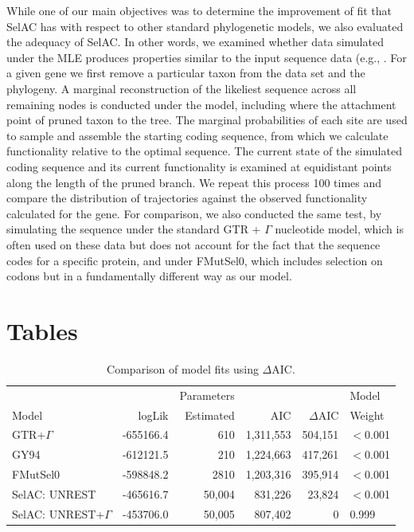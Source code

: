 \documentclass{article}
\newcommand{\DeltaAIC}{\ensuremath{\Delta\text{AIC}}\xspace}
\newcommand{\selac}{SelAC\xspace}
\begin{document}
While one of our main objectives was to determine the improvement of fit that \selac has with respect to other standard phylogenetic models, we also evaluated the adequacy of \selac.
In other words, we examined whether data simulated under the MLE produces properties similar to the input sequence data (e.g., \citet{BeaulieuEtAl2013}.
For a given gene we first remove a particular taxon from the data set and the phylogeny.
A marginal reconstruction of the likeliest sequence across all remaining nodes is conducted under the model, including where the attachment point of pruned taxon to the tree.
The marginal probabilities of each site are used to sample and assemble the starting coding sequence, from which we calculate functionality relative to the optimal sequence.
The current state of the simulated coding sequence and its current functionality is examined at equidistant points along the length of the pruned branch.
We repeat this process 100 times and compare the distribution of trajectories against the observed functionality calculated for the gene.
For comparison, we also conducted the same test, by simulating the sequence under the standard GTR + $\Gamma$ nucleotide model, which is often used on these data but does not account for the fact that the sequence codes for a specific protein, and under FMutSel0, which includes selection on codons but in a fundamentally different way as our model.




\section*{Tables}
  \begin{table}
    \begin{tabular}{lrrrrl}
      &          &Parameters &          &        & Model\\
      Model                 	& logLik   & Estimated &     AIC& \DeltaAIC&  Weight\\\hline
      GTR+$\Gamma$        		& -655166.4&        610& 1,311,553& 504,151&$<$0.001\\
      GY94                  	& -612121.5&        210& 1,224,663& 417,261&$<$0.001\\
      FMutSel0              		& -598848.2&       2810& 1,203,316& 395,914&$<$0.001\\
      SelAC: UNREST         	& -465616.7&       50,004&   831,226&  23,824&$<$0.001\\
      SelAC: UNREST+$\Gamma$ 	& -453706.0&       50,005&   807,402&       0& 0.999
    \end{tabular}
    \caption{Comparison of model fits using $\DeltaAIC$.}
    \label{table:modelFits}
\end{table}
\end{document}
